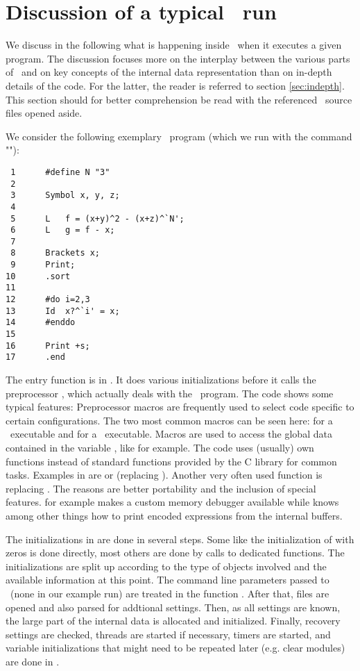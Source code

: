 \section{Discussion of a typical \FORM\ run}

We discuss in the following what is happening inside \FORM\ when it executes a
given program. The discussion focuses more on the interplay between the various
parts of \FORM\ and on key concepts of the internal data representation than on
in-depth details of the code. For the latter, the reader is referred to section
\ref{sec:indepth}. This section should for better comprehension be read with the
referenced \FORM\ source files opened aside.

We consider the following exemplary \FORM\ program  (which we run
with the command ""):

\begin{verbatim}
 1      #define N "3"
 2      
 3      Symbol x, y, z;
 4      
 5      L	f = (x+y)^2 - (x+z)^`N';
 6      L	g = f - x;
 7      
 8      Brackets x;
 9      Print;
10      .sort
11      
12      #do i=2,3
13      Id	x?^`i' = x;
14      #enddo
15      
16      Print +s;
17      .end
\end{verbatim}

The entry function  is in . It does various
initializations before it calls the preprocessor , which
actually deals with the \FORM\ program. The code shows some typical features:
Preprocessor macros are frequently used to select code specific to certain
configurations. The two most common macros can be seen here: 
for a \TFORM\ executable and  for a \PARFORM\ executable. Macros are
used to access the global data contained in the variable , like 
 for example. The code uses (usually) own functions instead of
standard functions provided by the C library for common tasks. Examples in
 are  or  (replacing ). Another
very often used function is  replacing . The reasons
are better portability and the inclusion of special features.   for
example makes a custom memory debugger available while  knows
among other things how to print encoded expressions from the internal buffers.

The initializations in  are done in several steps. Some like the
initialization of  with zeros is done directly, most others are done by
calls to dedicated functions. The initializations are split up according to the
type of objects involved and the available information at this point. The
command line parameters passed to \FORM\ (none in our example run) are treated
in the function . After that, files are opened and also parsed for
addtional settings. Then, as all settings are known, the large part of the
internal data is allocated and initialized. Finally, recovery settings are
checked, threads are started if necessary, timers are started, and variable
initializations that might need to be repeated later (e.g. clear modules) are
done in .


